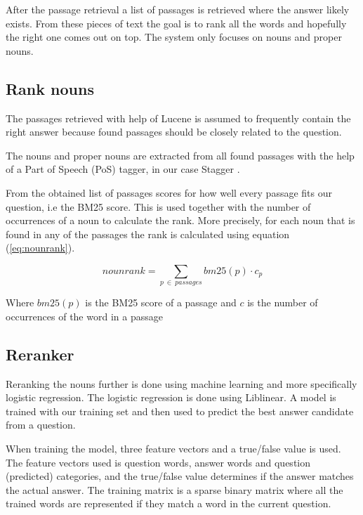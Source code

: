 After the passage retrieval a list of passages is retrieved where the answer likely exists. 
From these pieces of text the goal is to rank all the words and hopefully the right one comes out on top.
The system only focuses on nouns and proper nouns.

\subsection{Rank nouns}

The passages retrieved with help of Lucene is assumed to frequently contain the right answer
because found passages should be closely related to the question.

The nouns and proper nouns are extracted from all found passages with the help of a Part of Speech (PoS) 
tagger, in our case Stagger \cite{stagger}.

From the obtained list of passages scores for how well every passage fits our question, i.e the BM25 score. 
This is used together with the number of occurrences of a noun to calculate the rank.
More precisely, for each noun that is found in any of the passages the rank is calculated using equation (\ref{eq:nounrank}).

\begin{equation}
nounrank = \sum_{p\:\in\:passages}bm25(p) \cdot c_p
\label{eq:nounrank}
\end{equation}

Where $bm25(p)$ is the BM25 score of a passage and $c$ is the number of occurrences of the word in a passage

\subsection{Reranker}

Reranking the nouns further is done using machine learning and more specifically logistic regression.
The logistic regression is done using Liblinear. \cite{liblinear}
A model is trained with our training set and then used to predict the best answer candidate from a question.

When training the model, three feature vectors and a true/false value is used. 
The feature vectors used is question words, answer words and question (predicted) categories, and the true/false
value determines if the answer matches the actual answer. The training matrix is a sparse binary matrix where 
all the trained words are represented if they match a word in the current question.

